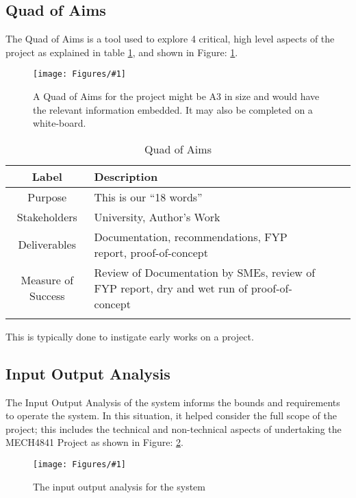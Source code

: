\documentclass{UoNMCHA}
\newcommand{\fref}[1] {Figure: \ref{#1}}
\newcommand{\fFigure}[3]{
	\begin{figure}[h]
        \begin{center}  
            \texttt{[image: Figures/\#1]}  
            \caption{#2}
            \label{#1}
        \end{center}
	\end{figure}
}
\numberwithin{equation}{section}
\begin{document}
\subsection{Quad of Aims}
The Quad of Aims is a tool used to explore 4 critical, high level aspects of the project as explained in table \ref{tab:QuadOfAims}, and shown in \fref{QuadOfAims2.png}.

\fFigure{QuadOfAims2.png}{A Quad of Aims for the project might be A3 in size and would have the relevant information embedded. It may also be completed on a white-board.}{0.7}

 \begin{table}[h]
    \begin{center}
        \caption{Quad of Aims }\label{tab:QuadOfAims}
        {\footnotesize
            \begin{tabular}{c l l l|}
                \hline\hline Label & Description \\ \hline 
                Purpose & This is our “18 words” \\
                Stakeholders & University, Author’s Work \\
                Deliverables & Documentation, recommendations, FYP report, proof-of-concept \\
                Measure of Success & Review of Documentation by SMEs, review of FYP report, dry and wet run of proof-of-concept \\
                \\ \hline
            \end{tabular}
        }
    \end{center}
\end{table}

This is typically done to instigate early works on a project.

\subsection{Input Output Analysis}
The Input Output Analysis of the system informs the bounds and requirements to operate the system. In this situation, it helped consider the full scope of the project; this includes the technical and non-technical aspects of undertaking the MECH4841 Project as shown in \fref{InputOutput.png}.

\fFigure{InputOutput.png}{The input output analysis for the system}{0.75}
\end{document}
